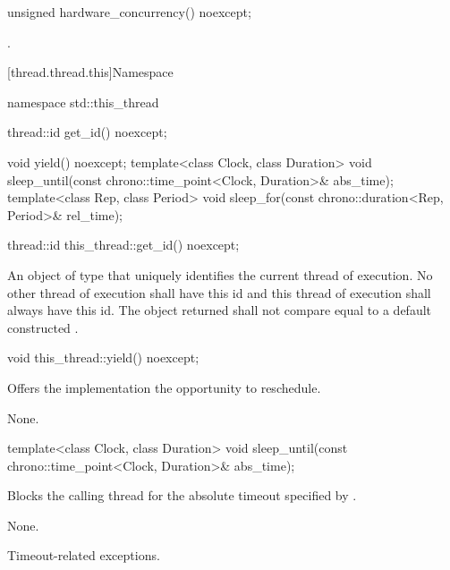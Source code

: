 %
\begin{itemdecl}
unsigned hardware_concurrency() noexcept;
\end{itemdecl}

\begin{itemdescr}
\pnum
\returns {}.
\end{itemdescr}


[thread.thread.this]{Namespace }

\begin{codeblock}
namespace std::this_thread {
  thread::id get_id() noexcept;

  void yield() noexcept;
  template<class Clock, class Duration>
    void sleep_until(const chrono::time_point<Clock, Duration>& abs_time);
  template<class Rep, class Period>
    void sleep_for(const chrono::duration<Rep, Period>& rel_time);
}
\end{codeblock}

%
\begin{itemdecl}
thread::id this_thread::get_id() noexcept;
\end{itemdecl}

\begin{itemdescr}
\pnum
\returns An object of type  that uniquely identifies the current thread of
execution. No other thread of execution shall have this id and this thread of execution shall
always have this id. The object returned shall not compare equal to a default constructed
.
\end{itemdescr}

%
\begin{itemdecl}
void this_thread::yield() noexcept;
\end{itemdecl}

\begin{itemdescr}
\pnum
\effects Offers the implementation the opportunity to reschedule.

\pnum
\sync None.
\end{itemdescr}

%
\begin{itemdecl}
template<class Clock, class Duration>
  void sleep_until(const chrono::time_point<Clock, Duration>& abs_time);
\end{itemdecl}

\begin{itemdescr}
\pnum
\effects Blocks the calling thread for the absolute timeout specified
by .

\pnum
\sync None.

\pnum
\throws Timeout-related exceptions.
\end{itemdescr}

